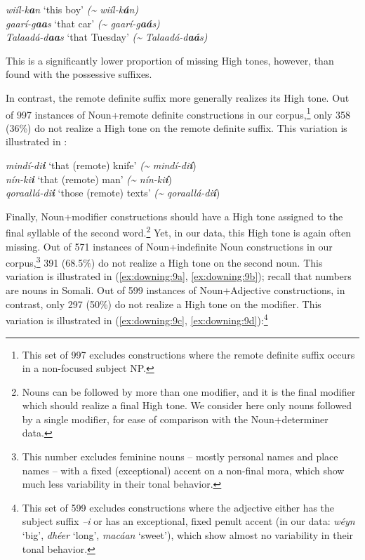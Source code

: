 \documentclass[output=paper]{langscibook}
\begin{document}
\ea
\label{ex:downing:7}


\ea  \textit{wiíl-k}\textbf{\textit{a}}\textit{n}  ‘this boy’  \textit{({\textasciitilde} wiíl-k}\textbf{\textit{á}}\textit{n)}\\

\ex   \textit{gaarí-g}\textbf{\textit{aa}}\textit{s}  ‘that car’  \textit{({\textasciitilde} gaarí-g}\textbf{\textit{aá}}\textit{s)}\\

\ex   \textit{Talaadá-d}\textbf{\textit{aa}}\textit{s}  ‘that Tuesday’  \textit{({\textasciitilde} Talaadá-d}\textbf{\textit{aá}}\textit{s)}\\
\z
\z

This is a significantly lower proportion of missing High tones, however, than found with the possessive suffixes.

In contrast, the remote definite suffix more generally realizes its High tone. Out of 997 instances of Noun+remote definite constructions in our corpus,\footnote{This set of 997 excludes constructions where the remote definite suffix occurs in a non-focused subject NP.} only 358 (36\%) do not realize a High tone on the remote definite suffix. This variation is illustrated in :


\ea \label{ex:downing:8}
\ea  \textit{mindí-di}\textbf{\textit{i}}  ‘that (remote) knife’  \textit{({\textasciitilde} mindí-di}\textbf{\textit{í}})\\
\ex   \textit{nín-ki}\textbf{\textit{i}}  ‘that (remote) man’  \textit{({\textasciitilde} nín-ki}\textbf{\textit{í}})\\
\ex   \textit{qoraallá-di}\textbf{\textit{i}}  ‘those (remote) texts’  \textit{({\textasciitilde} qoraallá-di}\textbf{\textit{í}})\\
\z
\z

Finally, Noun+modifier constructions should have a High tone assigned to the final syllable of the second word.\footnote{Nouns can be followed by more than one modifier, and it is the final modifier which should realize a final High tone. We consider here only nouns followed by a single modifier, for ease of comparison with the Noun+determiner data.} Yet, in our data, this High tone is again often missing. Out of 571 instances of Noun+indefinite Noun constructions in our corpus,\footnote{This number excludes feminine nouns – mostly personal names and place names – with a fixed (exceptional) accent on a non-final mora, which show much less variability in their tonal behavior.} 391 (68.5\%) do not realize a High tone on the second noun. This variation is illustrated in (\ref{ex:downing:9a}, \ref{ex:downing:9b}); recall that numbers are nouns in Somali. Out of 599 instances of Noun+Adjective constructions, in contrast, only 297 (50\%) do not realize a High tone on the modifier. This variation is illustrated in (\ref{ex:downing:9c}, \ref{ex:downing:9d}):\footnote{This set of 599 excludes constructions where the adjective either has the subject suffix \textit{–i} or has an exceptional, fixed penult accent (in our data: \textit{wéyn} ‘big’, \textit{dhéer} ‘long’, \textit{macáan} ‘sweet’), which show almost no variability in their tonal behavior.} 
\end{document}
